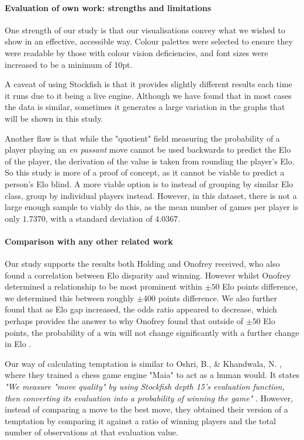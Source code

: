 \documentclass[10pt,a4paper]{article}
\begin{document}
\begin{multicols}{2}
\paragraph{Evaluation of own work: strengths and limitations}
One strength of our study is that our visualisations convey what we wished to show in an effective, accessible way. Colour palettes were selected to ensure they were readable by those with colour vision deficiencies, and font sizes were increased to be a minimum of 10pt.

A caveat of using Stockfish is that it provides slightly different results each time it runs due to it being a live engine. Although we have found that in most cases the data is similar, sometimes it generates a large variation in the graphs that will be shown in this study.\newline

Another flaw is that while the "quotient"  field measuring the probability of a player playing an \textit{en passant} move cannot be used backwards to predict the Elo of the player, the derivation of the value is taken from rounding the player's Elo. So this study is more of a proof of concept, as it cannot be viable to predict a person's Elo blind. A more viable option is to instead of grouping by similar Elo class, group by individual players instead. However, in this dataset, there is not a large enough sample to viably do this, as the mean number of games per player is only $1.7370$, with a standard deviation of $4.0367$.


\paragraph{Comparison with any other related work}
Our study supports the results both Holding \cite{PsychologyOfChessSkill} and Onofrey \cite{HowMuchDoesEloMatter} received, who also found a correlation between Elo disparity and winning. However whilst Onofrey \cite{HowMuchDoesEloMatter} determined a relationship to be most prominent within $\pm 50$ Elo points difference, we determined this between roughly $\pm 400$ points difference. We also further found that as Elo gap increased, the odds ratio appeared to decrease, which perhaps provides the answer to why Onofrey found that outside of $\pm 50$ Elo points, the
probability of a win will not change significantly with a further change in Elo \cite{HowMuchDoesEloMatter}. \newline

Our way of calculating temptation is similar to Oshri, B., \& Khandwala, N. \cite{mcilroy2022learning}, where they trained a chess game engine "Maia" to act as a human would. It states \textit{"We measure "move quality" by using Stockfish depth 15's evaluation function, then converting its evaluation into a probability of winning the game"} \cite{mcilroy2022learning}. However, instead of comparing a move to the best move, they obtained their version of a temptation by comparing it against a ratio of winning players and the total number of observations at that evaluation value.




\end{multicols}
\end{document}
